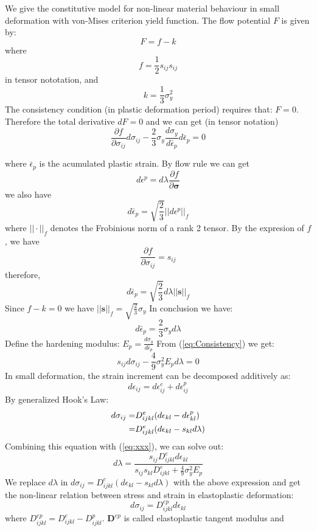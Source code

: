 \documentclass{article}
\begin{document}
We give the constitutive model for non-linear material behaviour in small deformation with von-Mises criterion yield function.
The flow potential $F$ is given by:
\[
F=f-k
\]
where
\[
f=\frac{1}{2}s_{ij}s_{ij}
\]
in tensor nototation, and 
\[
k=\frac{1}{3}\sigma_{y}^2
\]
The consistency condition (in plastic deformation period) requires that:
$F=0$.
Therefore the total derivative $dF=0$
and we can get (in tensor notation)
\begin{equation}\label{eq:Consistency}
\frac{\partial{f}}{\partial \sigma_{ij}}d\sigma_{ij}-\frac{2}{3}\sigma_{y}\frac{d\sigma_y}{d\bar{\epsilon}_p}d\bar{\epsilon}_p=0
\end{equation}

where $\bar{\epsilon}_p$ is the acumulated plastic strain.
By flow rule we can get 
\[
d \epsilon^p=d\lambda \frac{\partial f}{\partial{\bm{\sigma}}}
\]
we also have \[
d \bar{\epsilon}_p=\sqrt{\frac{2}{3}}||d\epsilon^p||_f
\]
where $||\cdot||_f$ denotes the Frobinious norm of a rank 2 tensor.
By the expresion of $f$,
we have
\[
\frac{\partial{f}}{\partial \sigma_{ij}}=s_{ij}
\]
therefore,
\[
d \bar{\epsilon}_p=\sqrt{\frac{2}{3}}d\lambda||\bm{s}||_f
\]
Since $f-k=0$ we have $||\bm{s}||_f=\sqrt{\frac{2}{3}}\sigma_y$
In conclusion we have:
\begin{equation}
d \bar{\epsilon}_p=\frac{2}{3}\sigma_yd\lambda
\end{equation}
Define the hardening modulus: $E_p=\frac{d\sigma_y}{d\bar{\epsilon}_p}$
From (\ref{eq:Consistency}) we get:
\begin{equation}\label{eq:xxx}
s_{ij}d\sigma_{ij}-\frac{4}{9}\sigma_y^2E_pd\lambda=0
\end{equation}
In small deformation, the strain increment can be decomposed additively as: 
\[
d\epsilon_{ij}=d \epsilon_{ij}^e+d \epsilon_{ij}^p
\]
By generalized Hook's Law:
\begin{align*}\notag
d\sigma_{ij}=&D^e_{ijkl}(d\epsilon_{kl}-d\epsilon_{kl}^p)\\
=&D^e_{ijkl}(d\epsilon_{kl}-s_{kl}d\lambda )
\end{align*}
Combining this equation with (\ref{eq:xxx}), we can solve out:
\[
d\lambda=\frac{s_{ij}D_{ijkl}^e d \epsilon_{kl}}{s_{ij}s_{kl}D^e_{ijkl}+\frac{4}{9}\sigma_y^2 E_p}
\]
We replace $d\lambda$ in $d\sigma_{ij}=D^e_{ijkl}(d\epsilon_{kl}-s_{kl}d\lambda )$ with the above expression and get the non-linear relation between stress and strain in elastoplastic deformation:
\[
d\sigma_{ij}=D^{ep}_{ijkl}d \epsilon_{kl}
\]
where $D^{ep}_{ijkl}=D^e_{ijkl}-D^p_{ijkl}$. $\bm{D}^{ep}$ is called  elastoplastic tangent modulus and 
\end{document}
